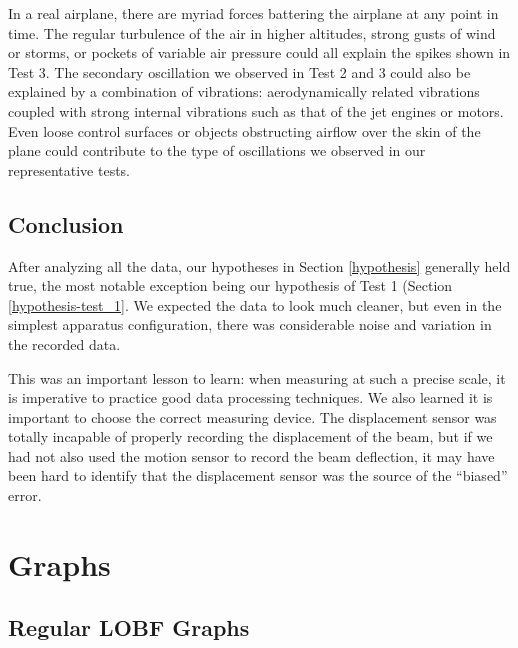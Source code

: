 \documentclass[12 pt]{report}
\begin{document}
In a real airplane, there are myriad forces battering the airplane at any point in time. The regular turbulence of the air in higher altitudes, strong gusts of wind or storms, or pockets of variable air pressure could all explain the spikes shown in Test \num{3}. The secondary oscillation we observed in Test \num{2} and \num{3} could also be explained by a combination of vibrations: aerodynamically related vibrations coupled with strong internal vibrations such as that of the jet engines or motors. Even loose control surfaces or objects obstructing airflow over the skin of the plane could contribute to the type of oscillations we observed in our representative tests.

\section{Conclusion} \label{conclusion-section}
After analyzing all the data, our hypotheses in Section \ref{hypothesis} generally held true, the most notable exception being our hypothesis of Test \num{1} (Section \ref{hypothesis-test_1}. We expected the data to look much cleaner, but even in the simplest apparatus configuration, there was considerable noise and variation in the recorded data.

This was an important lesson to learn: when measuring at such a precise scale, it is imperative to practice good data processing techniques. We also learned it is important to choose the correct measuring device. The displacement sensor was totally incapable of properly recording the displacement of the beam, but if we had not also used the motion sensor to record the beam deflection, it may have been hard to identify that the displacement sensor was the source of the ``biased'' error.

\printbibliography[heading=subbibintoc]

\appendix
\chapter{Graphs} \label{graphs}
\section{Regular LOBF Graphs} \label{regular_lobf_graphs}

\end{document}
